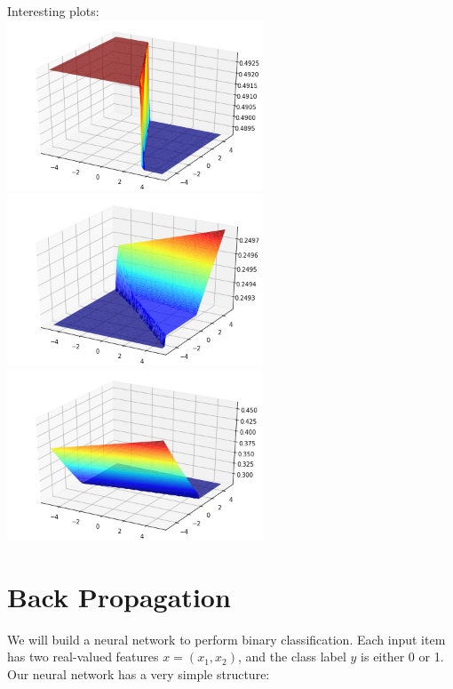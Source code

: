 \documentclass[a4paper]{article}
\theoremstyle{definition}
\newenvironment{soln}{
    \leavevmode\color{blue}\ignorespaces
}{}
\begin{document}
\begin{enumerate}
\begin{soln}
Interesting plots:\\
\includegraphics[width=3in]{Q14_3.png}
\includegraphics[width=3in]{Q14_7.png}\\
\includegraphics[width=3in]{Q14_8.png}\\

\end{soln}

\end{enumerate}

\section{Back Propagation}

We will build a neural network to perform binary classification.
Each input item has two real-valued features $x=(x_1, x_2)$, and the class label $y$ is either 0 or 1.
Our neural network has a very simple structure: 
\end{document}
